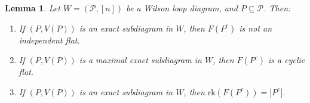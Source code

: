 \documentclass[11pt]{article}
\newcommand{\rk}{\textrm{rk} }
\newcommand{\cP}{\mathcal{P}}
\newtheorem{lem}[thm]{Lemma}
\theoremstyle{remark}
\theoremstyle{definition}
\begin{document}
\begin{lem} \label{maxexactcomplementrank}
Let $W = (\cP, [n])$ be a Wilson loop diagram, and $P \subseteq \cP$. Then: \begin{enumerate}
\item If $(P,V(P))$ is an exact subdiagram in $W$, then $F(P^c)$ is not an independent flat.
\item If $(P,V(P))$ is a maximal exact subdiagram in $W$, then $F(P^c)$ is a cyclic flat.                                                                                                                                                                                                                                                                                                                                                                                                                                                                                                                                                                                                                                                                                                                                                                                                                                                                                                                                                                          \item If $(P,V(P))$ is an exact subdiagram in $W$, then $\rk(F(P^c)) = |P^c|$.
\end{enumerate}
\end{lem}
\end{document}
